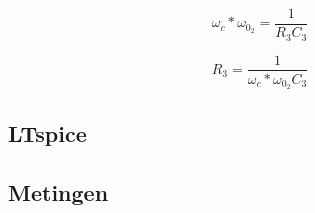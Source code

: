\begin{flushright}
	\begin{minipage}{0.37\textwidth}
		\begin{equation} \label{eq:rc}
			\omega_c*\omega_{0_2}=\frac{1}{R_3C_3}
		\end{equation}
	\end{minipage}
	\begin{minipage}{0.37\textwidth}
		\begin{equation} \label{eq:rcValR}
			R_3=\frac{1}{\omega_c*\omega_{0_2}C_3}
		\end{equation}
	\end{minipage}
\end{flushright}
\newpage
\subsection{LTspice}

\subsection{Metingen}
